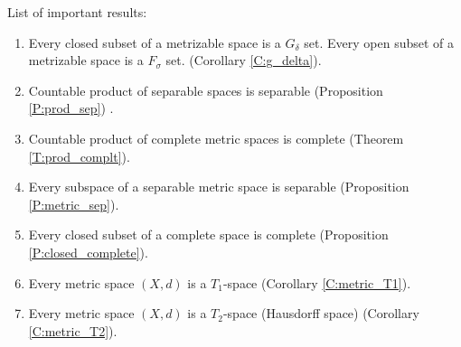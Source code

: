 \newpage
List of important results:
\begin{enumerate}
  \item Every closed subset of a metrizable space is a $G_{\delta}$ set.
        Every open subset of a metrizable space is a $F_{\sigma}$ set.
    (Corollary \ref{C:g_delta}).
  \item Countable product of separable spaces is separable (Proposition
	\ref{P:prod_sep}) .
  \item	Countable product of complete metric spaces is complete (Theorem 
	\ref{T:prod_complt}).
  \item Every subspace of a separable metric space is separable (Proposition
	\ref{P:metric_sep}).
  \item Every closed subset of a complete space is complete (Proposition
	\ref{P:closed_complete}).
  \item Every metric space $(X,d)$ is a $T_1$-space (Corollary
        \ref{C:metric_T1}).
  \item Every metric space $(X,d)$ is a $T_2$-space (Hausdorff space) (Corollary
        \ref{C:metric_T2}).
\end{enumerate}



